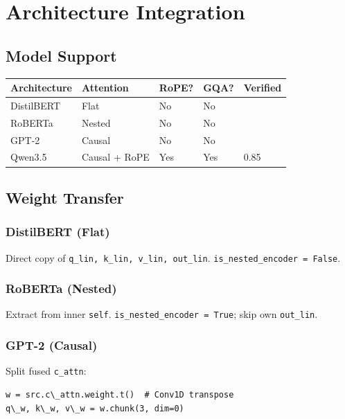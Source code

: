 
\section{Architecture Integration}

\subsection{Model Support}

\begin{table}[H]
\centering
\small
\begin{tabular}{lllll}
\toprule
\textbf{Architecture} & \textbf{Attention} & \textbf{RoPE?} & \textbf{GQA?} & \textbf{Verified} \\
\midrule
DistilBERT & Flat & No & No &  \\
RoBERTa & Nested & No & No &  \\
GPT-2 & Causal & No & No &  \\
Qwen3.5 & Causal + RoPE & Yes & Yes & 0.85 \\
\bottomrule
\end{tabular}
\end{table}

\subsection{Weight Transfer}

\subsubsection{DistilBERT (Flat)}

Direct copy of \texttt{q\_lin, k\_lin, v\_lin, out\_lin}. \texttt{is\_nested\_encoder = False}.

\subsubsection{RoBERTa (Nested)}

Extract from inner \texttt{self}. \texttt{is\_nested\_encoder = True}; skip own \texttt{out\_lin}.

\subsubsection{GPT-2 (Causal)}

Split fused \texttt{c\_attn}:

\begin{lstlisting}
w = src.c\_attn.weight.t()  # Conv1D transpose
q\_w, k\_w, v\_w = w.chunk(3, dim=0)
\end{lstlisting}

